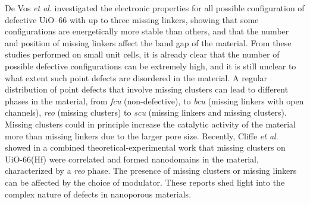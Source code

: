 De Vos \textit{et al}.\cite{devos2017missing} investigated the electronic properties for all possible configuration of defective UiO--66 with up to three missing linkers, showing that some configurations are energetically more stable than others, and that the number and position of missing linkers affect the band gap of the material. From these studies performed on small unit cells, it is already clear that the number of possible defective configurations can be extremely high, and it is still unclear to what extent such point defects are disordered in the material. A regular distribution of point defects that involve missing clusters can lead to different phases in the material, from \textit{fcu} (non-defective), to \textit{bcu} (missing linkers with open channels), \textit{reo} (missing clusters) to \textit{scu} (missing linkers and missing clusters). Missing clusters could in principle increase the catalytic activity of the material more than missing linkers due to the larger pore size. Recently, Cliffe \textit{et al}. \cite{cliffe2014correlated} showed in a combined theoretical-experimental work that missing clusters on UiO-66(Hf) were correlated and formed nanodomains in the material, characterized by a \textit{reo} phase. The presence of missing clusters or missing linkers can be affected by the choice of modulator\cite{svane2018vacancy}. These reports shed light into the complex nature of defects in nanoporous materials. 

